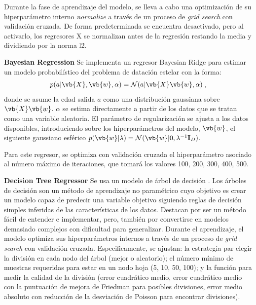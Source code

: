 Durante la fase de aprendizaje del modelo, se lleva a cabo una optimización de su hiperparámetro interno \emph{normalize} a través de un proceso de \emph{grid search} con validación cruzada. De forma predeterminada se encuentra desactivado, pero al activarlo, los regresores X se normalizan antes de la regresión restando la media y dividiendo por la norma l2.

\vspace{0.5cm}

\textbf{Bayesian Regression} {} Se implementa un regresor Bayesian Ridge para estimar un modelo probabilístico del problema de datación estelar con la forma:
\begin{equation}
p(a|\vb{X},\vb{w},\alpha) = \mathcal{N}(a|\vb{X} \vb{w},\alpha)\; ,
\end{equation}
donde se asume la edad salida $a$ como una distribución gaussiana sobre $\vb{X}\vb{w}$. $\alpha$ se estima directamente a partir de los datos que se tratan como una variable aleatoria. El parámetro de regularización se ajusta a los datos disponibles, introduciendo sobre los hiperparámetros del modelo, \ie $\vb{w}$, el siguiente gaussiano esférico $p(\vb{w}|\lambda) =
\mathcal{N}(\vb{w}|0,\lambda^{-1}\mathbf{I}_{D})$.

Para este regresor, se optimiza con validación cruzada el hiperparámetro asociado al número máximo de iteraciones, que tomará los valores 100, 200, 300, 400, 500.

\vspace{0.5cm}

\textbf{Decision Tree Regressor} {} Se usa un modelo de árbol de decisión \cite{Breiman1984}. %
Los árboles de decisión son un método de aprendizaje no paramétrico cuyo objetivo es crear un modelo capaz de predecir una variable objetivo siguiendo reglas de decisión simples inferidas de las características de los datos. Destacan por ser un método fácil de entender e implementar, pero, también por convertirse en modelos demasiado complejos con dificultad para generalizar.
Durante el aprendizaje, el modelo optimiza sus hiperparámetros internos a través de un proceso de \emph{grid search} con validación cruzada. Especificamente, se ajustan: la estrategia par elegir la división en cada nodo del árbol (mejor o aleatorio); el número mínimo de muestras requeridas para estar en un nodo hoja (5, 10, 50, 100); y la función para medir la calidad de la división (error cuadrático medio, error cuadrático medio con la puntuación de mejora de Friedman para posibles divisiones, error medio absoluto con reducción de la desviación de Poisson para encontrar divisiones). 

